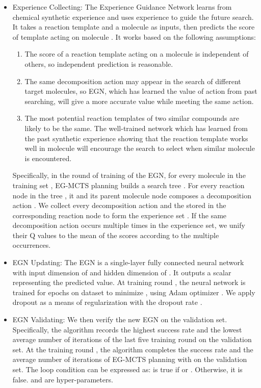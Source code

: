 \documentclass[sn-mathphys,Numbered]{sn-jnl}
\begin{document}
\begin{itemize}
    \item Experience Collecting: The Experience Guidance Network learns from chemical synthetic experience and uses experience to guide the future search. It takes a reaction template  and a molecule  as inputs, then predicts the score of template  acting on molecule . It works based on the following assumptions:
    \begin{enumerate}
        \item The score of a reaction template acting on a molecule is independent of others, so independent prediction is reasonable.
        \item The same decomposition action  may appear in the search of different target molecules, so EGN, which has learned the value of action  from past searching, will give a more accurate value while meeting the same action.
        \item The most potential reaction templates of two similar compounds are likely to be the same. The well-trained network which has learned from the past synthetic experience showing that the reaction template  works well in molecule  will encourage the search to select  when similar molecule  is encountered.
    \end{enumerate}
    Specifically, in the  round of training of the EGN, for every molecule  in the training set , EG-MCTS planning builds a search tree . For every reaction node  in the tree , it and its parent molecule node  composes a decomposition action . We collect every decomposition action  and the  stored in the corresponding  reaction node  to form the experience set . If the same decomposition action  occurs multiple times in the experience set, we unify their Q values to the mean of the scores according to the multiple occurrences.
    \item EGN Updating: The EGN is a single-layer fully connected neural network with input dimension of  and hidden dimension of . It outputs a scalar  representing the predicted value. 
    At training round , the neural network  is trained for  epochs on dataset  to minimize , using Adam optimizer \citep{Adam}.
    We apply dropout \citep{dropout} as a means of regularization with the dropout rate .
        
    \item EGN Validating: We then verify the new EGN   on the validation set. Specifically, the algorithm records the highest success rate  and the lowest average number of iterations  of the last five training round on the validation set. At the training round , the algorithm completes the success rate  and the average number of iterations  of EG-MCTS planning with  on the validation set. The loop condition  can be expressed as:  is true if  or . Otherwise, it is false.  and  are hyper-parameters.
\end{itemize}
\end{document}
